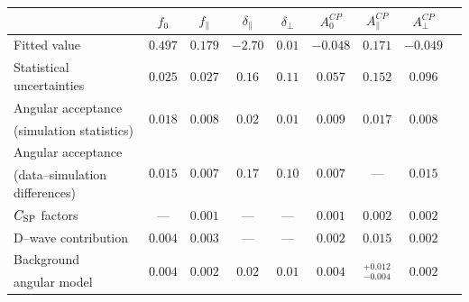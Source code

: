 \documentclass[12pt,a4paper]{article}
\def\delpar{\delta_\parallel}
\def\delperp{\delta_\perp}
\newcommand{\ACPL}{\ensuremath{A^{C\!P}_0}\xspace}
\newcommand{\ACPpa}{\ensuremath{A^{C\!P}_{\|}}\xspace}
\newcommand{\ACPpe}{\ensuremath{A^{C\!P}_{\perp}}\xspace}
\newcommand{\fL}{\ensuremath{f_0}\xspace}
\newcommand{\fpa}{\ensuremath{f_{\|}}\xspace}
\newcommand{\dwave}{{\rm D--wave}\xspace}
\begin{document}
\begin{table}[t!]
\begin{center}
{\begin{tabular}{lcccccccc}
&  $\fL$  & $\fpa$ & $\delpar$ & $\delperp$ & \ACPL & \ACPpa & \ACPpe  \\ [+0.04in]
\hline
\multirow{2}{*}{Fitted value} & \multirow{2}{*}{$0.497$} & \multirow{2}{*}{$0.179$} & \multirow{2}{*}{$-2.70$}& \multirow{2}{*}{$0.01$}& \multirow{2}{*}{$-0.048$}& \multirow{2}{*}{$0.171$} & \multirow{2}{*}{$-0.049$} \\ 
           & & & & & & &  \\ 
\hline
\multirow{2}{*}{Statistical uncertainties} & \multirow{2}{*}{$0.025$} & \multirow{2}{*}{$0.027$} & \multirow{2}{*}{$0.16$}& \multirow{2}{*}{$0.11$}& \multirow{2}{*}{$0.057$}& \multirow{2}{*}{$0.152$} & \multirow{2}{*}{$0.096$} \\ 
           & & & & & & &  \\ 
\hline
Angular acceptance & \multirow{2}{*}{$0.018$} & \multirow{2}{*}{$0.008$} & \multirow{2}{*}{$0.02$} & \multirow{2}{*}{$0.01$} & \multirow{2}{*}{$0.009$} & \multirow{2}{*}{$0.017$} & \multirow{2}{*}{$0.008$} \\
{\scriptsize(simulation statistics)}            & & & & & & &  \\
Angular acceptance        & \multirow{2}{*}{$0.015$} & \multirow{2}{*}{$0.007$} & \multirow{2}{*}{$0.17$}& \multirow{2}{*}{$0.10$}& \multirow{2}{*}{$0.007$}& \multirow{2}{*}{---} & \multirow{2}{*}{$0.015$} \\
{\scriptsize(data--simulation differences)}            & & & & & & &  \\
\multirow{2}{*}{$C_{\rm SP}$ factors}     & \multirow{2}{*}{---} & \multirow{2}{*}{$0.001$} & \multirow{2}{*}{---} & \multirow{2}{*}{---} & \multirow{2}{*}{$0.001$} & \multirow{2}{*}{$0.002$} & \multirow{2}{*}{$0.002$} & \\
                       & & & & & & &  \\
\multirow{2}{*}{\dwave contribution}  & \multirow{2}{*}{$0.004$} & \multirow{2}{*}{$0.003$} & \multirow{2}{*}{---}& \multirow{2}{*}{---}& \multirow{2}{*}{$0.002$}& \multirow{2}{*}{$0.015$} & \multirow{2}{*}{$0.002$} \\                    
                          & & & & & & &  \\
Background                  & \multirow{2}{*}{$0.004$} & \multirow{2}{*}{$0.002$} & \multirow{2}{*}{$0.02$}& \multirow{2}{*}{$0.01$}& \multirow{2}{*}{$0.004$}& \multirow{2}{*}{$^{+	0.012	}_{-	0.004	}$} & \multirow{2}{*}{$0.002$} \\
angular model               & & & & & & &  \\

\end{tabular}}
\end{center}
\end{table}
\end{document}
